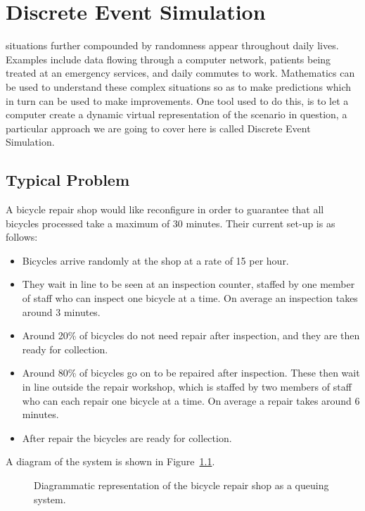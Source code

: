 \chapter[Discrete Event Simulation]{Discrete Event Simulation}

 situations further compounded by randomness appear
throughout daily lives. Examples include data flowing through a computer
network, patients being treated at an emergency services, and daily commutes to
work.
Mathematics can be used to understand these complex situations so as to
make predictions which in turn can be used to make improvements. One tool used
to do this, is to let a computer create a dynamic virtual representation of the
scenario in question, a particular approach we are going to cover here is called
Discrete Event Simulation.

\section{Typical Problem}\label{sec:problem}

A bicycle repair shop would like reconfigure
in order to guarantee that all bicycles processed take a maximum of 30 minutes.
Their current set-up is as follows:

\begin{itemize}
  \item Bicycles arrive randomly at the shop at a rate of 15 per hour.
  \item They wait in line to be seen at an inspection counter, staffed by one
  member of staff who can inspect one bicycle at a time. On average an
  inspection takes around 3 minutes.
  \item Around 20\% of bicycles do not need
  repair after inspection, and they are then ready for collection.
  \item Around 80\% of bicycles go on to be
  repaired after inspection. These then wait in line outside the repair
  workshop, which is staffed by two members of staff who can each repair
  one bicycle at a time. On average
  a repair takes around 6 minutes.
  \item After repair the bicycles are ready for collection.
\end{itemize}

A diagram of the system is shown in Figure~\ref{fig:bike-shop}.

\begin{figure}
    \begin{center}
        
    \end{center}
    \caption{
        Diagrammatic representation of the bicycle repair shop as a queuing
        system.
    }
    \label{fig:bike-shop}
\end{figure}

